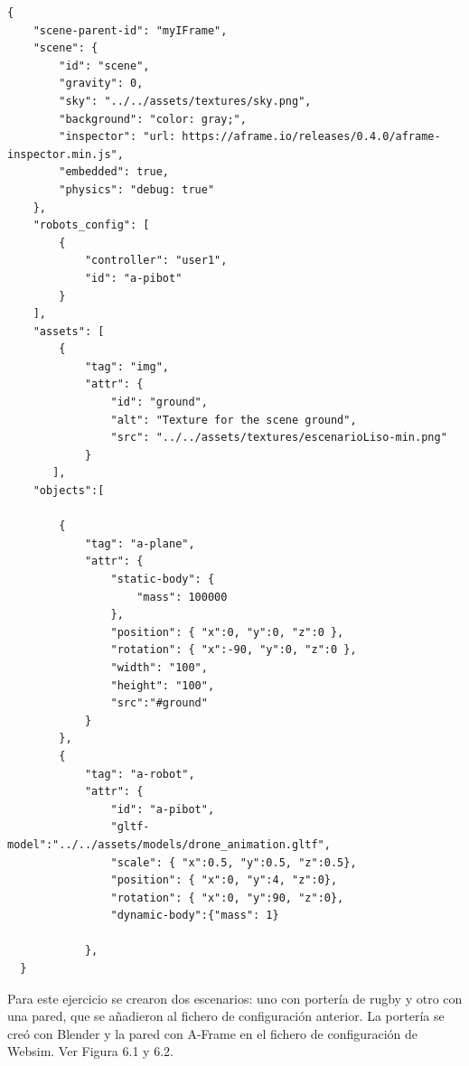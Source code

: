 \begin{lstlisting}
{
    "scene-parent-id": "myIFrame",
    "scene": {
        "id": "scene",
        "gravity": 0,
        "sky": "../../assets/textures/sky.png",
        "background": "color: gray;",
        "inspector": "url: https://aframe.io/releases/0.4.0/aframe-inspector.min.js",
        "embedded": true,
        "physics": "debug: true"
    },
    "robots_config": [
        {
            "controller": "user1",
            "id": "a-pibot"
        }
    ],
    "assets": [
        {
            "tag": "img",
            "attr": {
                "id": "ground",
                "alt": "Texture for the scene ground",
                "src": "../../assets/textures/escenarioLiso-min.png"
            }
       ],
    "objects":[
     
        {
            "tag": "a-plane",
            "attr": {
                "static-body": {
                    "mass": 100000
                },
                "position": { "x":0, "y":0, "z":0 },
                "rotation": { "x":-90, "y":0, "z":0 },
                "width": "100",
                "height": "100",
                "src":"#ground"
            }
        },
        {
            "tag": "a-robot",
            "attr": {
                "id": "a-pibot",
                "gltf-model":"../../assets/models/drone_animation.gltf",
                "scale": { "x":0.5, "y":0.5, "z":0.5},
                "position": { "x":0, "y":4, "z":0},
                "rotation": { "x":0, "y":90, "z":0},
                "dynamic-body":{"mass": 1}

            },      
  }
\end{lstlisting}


Para este ejercicio se crearon dos escenarios: uno con portería de rugby y otro con una pared, que se añadieron al  fichero de configuración anterior. La portería se creó con Blender y la pared con A-Frame en el fichero de configuración de Websim. Ver Figura 6.1 y 6.2.

